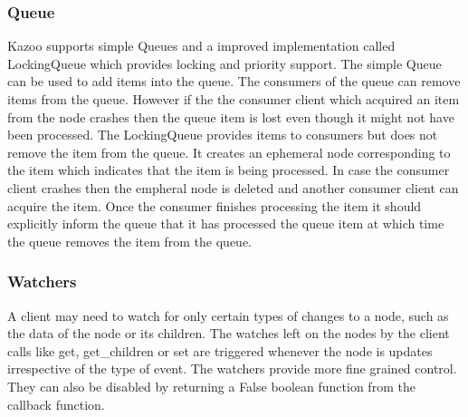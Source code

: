   \subsubsection{Queue}
    Kazoo supports simple Queues and a improved implementation called LockingQueue which provides locking and priority support. The simple Queue can be used to add items into the queue. The consumers of the queue can remove items from the queue. However if the the consumer client which acquired an item from the node crashes then the queue item is lost even though it might not have been processed. The LockingQueue provides items to consumers but does not remove the item from the queue. It creates an ephemeral node corresponding to the item which indicates that the item is being processed. In case the consumer client crashes then the empheral node is deleted and another consumer client can acquire the item. Once the consumer finishes processing the item it should explicitly inform the queue that it has processed the queue item at which time the queue removes the item from the queue.
  \subsubsection{Watchers}
  A client may need to watch for only certain types of changes to a node, such as the data of the node or its children. The watches left on the nodes by the client calls like get, get\_children or set are triggered whenever the node is updates irrespective of the type of event. The watchers provide more fine grained control. They can also be disabled by returning a False boolean function from the callback function.
  

